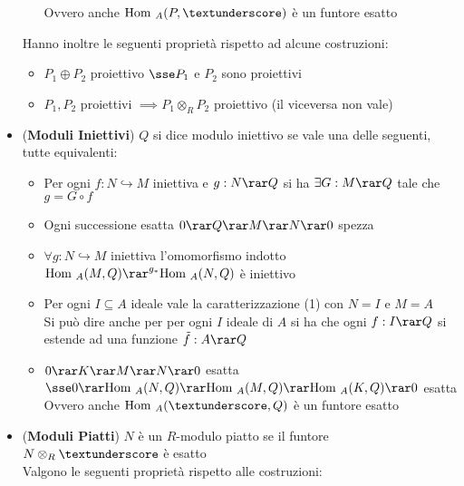 \documentclass[a4paper,NoNotes,GeneralMath]{stdmdoc}
\newcommand{\hrar}{\hookrightarrow}
\newcommand{\Hom}{\text{Hom }}
\begin{document}
\begin{itemize}
\begin{itemize}
					Ovvero anche $\Hom_A(P, \textunderscore)$ è un funtore esatto
			\end{itemize}
			Hanno inoltre le seguenti proprietà rispetto ad alcune costruzioni:
			\begin{itemize}
				\item $P_1 \oplus P_2$ proiettivo $\sse P_1$ e $P_2$ sono proiettivi
				\item $P_1, P_2$ proiettivi $\implies P_1 \otimes_R P_2$ proiettivo (il viceversa non vale)
			\end{itemize}
		\item ({\bf Moduli Iniettivi}) $Q$ si dice modulo iniettivo se vale una delle seguenti, tutte equivalenti:
			\begin{itemize}
				\item Per ogni $f: N \hrar M$ iniettiva e $g: N \rar Q$ si ha $\exists G: M \rar Q$ tale che $g = G \circ f$
				\item Ogni successione esatta $0 \rar Q \rar M \rar N \rar 0$ spezza
				\item $\forall g: N \hrar M$ iniettiva l'omomorfismo indotto $\Hom_A(M, Q) \rar^{g_*} \Hom_A(N, Q)$ è iniettivo
				\item Per ogni $I \subseteq A$ ideale vale la caratterizzazione (1) con $N = I$ e $M = A$ \\
					Si può dire anche per per ogni $I$ ideale di $A$ si ha che ogni $f: I \rar Q$ si estende ad una funzione $\tilde{f}: A \rar Q$
				\item $0 \rar K \rar M \rar N \rar 0$ esatta $\sse 0 \rar \Hom_A(N, Q) \rar \Hom_A(M, Q) \rar \Hom_A(K, Q) \rar 0$ esatta \\
					Ovvero anche $\Hom_A(\textunderscore, Q)$ è un funtore esatto
			\end{itemize}
		\item ({\bf Moduli Piatti}) $N$ è un $R$-modulo piatto se il funtore $N \otimes_R \textunderscore$ è esatto \\
			Valgono le seguenti proprietà rispetto alle costruzioni:
			\begin{itemize}

\end{itemize}
\end{itemize}
\end{document}
